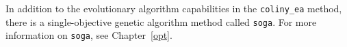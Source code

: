 In addition to the evolutionary algorithm capabilities in the
\texttt{coliny\_ea} method, there is a single-objective genetic algorithm
method called \texttt{soga}.
For more information on \texttt{soga}, see Chapter~\ref{opt}.

